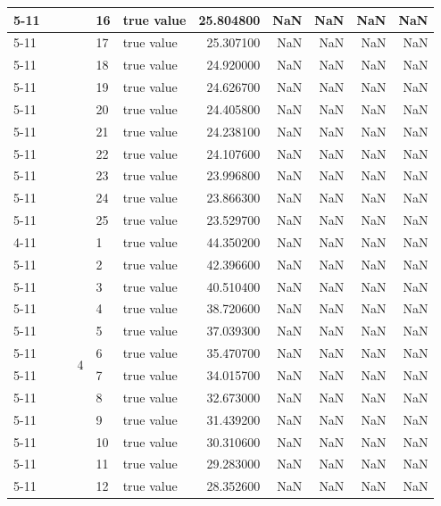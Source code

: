 \begin{tabular}{llllllrrrrr}
\cline{5-11}
 &  &  &  & 16 & true value & 25.804800 & NaN & NaN & NaN & NaN \\
\cline{5-11}
 &  &  &  & 17 & true value & 25.307100 & NaN & NaN & NaN & NaN \\
\cline{5-11}
 &  &  &  & 18 & true value & 24.920000 & NaN & NaN & NaN & NaN \\
\cline{5-11}
 &  &  &  & 19 & true value & 24.626700 & NaN & NaN & NaN & NaN \\
\cline{5-11}
 &  &  &  & 20 & true value & 24.405800 & NaN & NaN & NaN & NaN \\
\cline{5-11}
 &  &  &  & 21 & true value & 24.238100 & NaN & NaN & NaN & NaN \\
\cline{5-11}
 &  &  &  & 22 & true value & 24.107600 & NaN & NaN & NaN & NaN \\
\cline{5-11}
 &  &  &  & 23 & true value & 23.996800 & NaN & NaN & NaN & NaN \\
\cline{5-11}
 &  &  &  & 24 & true value & 23.866300 & NaN & NaN & NaN & NaN \\
\cline{5-11}
 &  &  &  & 25 & true value & 23.529700 & NaN & NaN & NaN & NaN \\
\cline{4-11} \cline{5-11}
 &  &  & \multirow[t]{25}{*}{4} & 1 & true value & 44.350200 & NaN & NaN & NaN & NaN \\
\cline{5-11}
 &  &  &  & 2 & true value & 42.396600 & NaN & NaN & NaN & NaN \\
\cline{5-11}
 &  &  &  & 3 & true value & 40.510400 & NaN & NaN & NaN & NaN \\
\cline{5-11}
 &  &  &  & 4 & true value & 38.720600 & NaN & NaN & NaN & NaN \\
\cline{5-11}
 &  &  &  & 5 & true value & 37.039300 & NaN & NaN & NaN & NaN \\
\cline{5-11}
 &  &  &  & 6 & true value & 35.470700 & NaN & NaN & NaN & NaN \\
\cline{5-11}
 &  &  &  & 7 & true value & 34.015700 & NaN & NaN & NaN & NaN \\
\cline{5-11}
 &  &  &  & 8 & true value & 32.673000 & NaN & NaN & NaN & NaN \\
\cline{5-11}
 &  &  &  & 9 & true value & 31.439200 & NaN & NaN & NaN & NaN \\
\cline{5-11}
 &  &  &  & 10 & true value & 30.310600 & NaN & NaN & NaN & NaN \\
\cline{5-11}
 &  &  &  & 11 & true value & 29.283000 & NaN & NaN & NaN & NaN \\
\cline{5-11}
 &  &  &  & 12 & true value & 28.352600 & NaN & NaN & NaN & NaN \\

\end{tabular}

